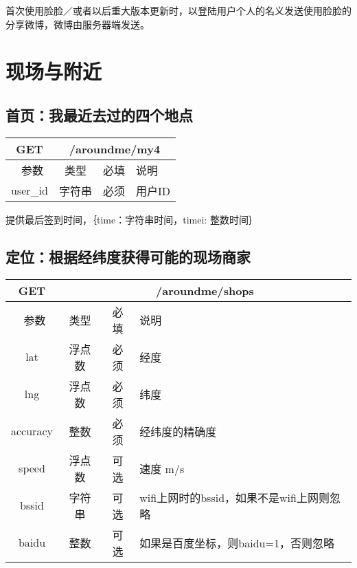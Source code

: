 \documentclass[cs4size]{ctexartutf8}
\begin{document}
首次使用脸脸／或者以后重大版本更新时，以登陆用户个人的名义发送使用脸脸的分享微博，微博由服务器端发送。


\section{现场与附近}

\subsection{首页：我最近去过的四个地点}

\begin{table}[H]
   \begin{center}
\begin{tabular}{|c|c|c|p{12cm}|}
\hline
GET & \multicolumn{3}{|c|}{/aroundme/my4} \\
\hline\hline
 \  参数  & 类型 & 必填 &  说明  \\
\hline
 user\_id  & 字符串 & 必须 & 用户ID\\
 \hline
\end{tabular}
   \end{center}
\end{table}

提供最后签到时间，｛time：字符串时间，timei: 整数时间｝


\subsection{定位：根据经纬度获得可能的现场商家}

\begin{table}[H]
   \begin{center}
\begin{tabular}{|c|c|c|p{12cm}|}
\hline
GET & \multicolumn{3}{|c|}{/aroundme/shops} \\
\hline\hline
 \  参数  & 类型 & 必填 &  说明  \\
\hline
 lat  & 浮点数 & 必须 & 经度\\
\hline
 lng  &  浮点数 & 必须 & 纬度\\ 
\hline
 accuracy  & 整数 & 必须 & 经纬度的精确度\\ 
\hline
 speed  & 浮点数 & 可选 & 速度 m/s\\   
\hline
 bssid  & 字符串 & 可选 & wifi上网时的bssid，如果不是wifi上网则忽略\\  
\hline
 baidu  & 整数 & 可选 & 如果是百度坐标，则baidu=1，否则忽略\\  
\hline
\end{tabular}
   \end{center}
\end{table}
\end{document}
